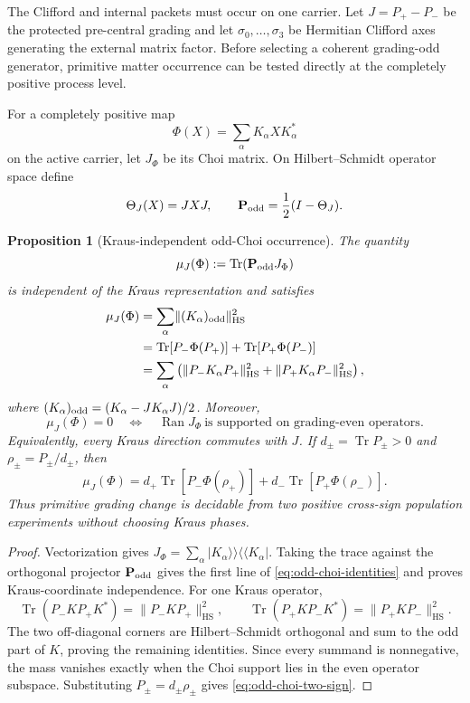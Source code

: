 \documentclass[11pt]{article}
\numberwithin{equation}{section}
\newtheorem{proposition}[theorem]{Proposition}
\theoremstyle{definition}
\theoremstyle{remark}
\newcommand{\Tr}{\operatorname{Tr}}
\newcommand{\Ran}{\operatorname{Ran}}
\newcommand{\HS}{\mathrm{HS}}
\newcommand{\norm}[1]{\lVert#1\rVert}
\begin{document}
The Clifford and internal packets must occur on one carrier.  Let
$J=P_+-P_-$ be the protected pre-central grading and let
$\sigma_0,\ldots,\sigma_3$ be Hermitian Clifford axes generating the external
matrix factor.  Before selecting a coherent grading-odd generator, primitive
matter occurrence can be tested directly at the completely positive process
level.

For a completely positive map
\[
\Phi(X)=\sum_\alpha K_\alpha X K_\alpha^*
\]
on the active carrier, let $J_\Phi$ be its Choi matrix.  On Hilbert--Schmidt
operator space define
\[
\Theta_J(X)=JXJ,
\qquad
\mathbf P_{\rm odd}=\frac12(I-\Theta_J).
\]

\begin{proposition}[Kraus-independent odd-Choi occurrence]
\label{thm:odd-choi-occurrence}
The quantity
\begin{equation}
\mu_J(\Phi):=\Tr(\mathbf P_{\rm odd}J_\Phi)
\label{eq:odd-choi-mass}
\end{equation}
is independent of the Kraus representation and satisfies
\begin{equation}
\begin{aligned}
\mu_J(\Phi)
&=\sum_\alpha\norm{(K_\alpha)_{\rm odd}}_{\HS}^2\\
&=\Tr[P_-\Phi(P_+)]+\Tr[P_+\Phi(P_-)]\\
&=\sum_\alpha\left(
\norm{P_-K_\alpha P_+}_{\HS}^2
+\norm{P_+K_\alpha P_-}_{\HS}^2\right),
\end{aligned}
\label{eq:odd-choi-identities}
\end{equation}
where $(K_\alpha)_{\rm odd}=(K_\alpha-JK_\alpha J)/2$.
Moreover,
\begin{equation}
\mu_J(\Phi)=0
\quad\Longleftrightarrow\quad
\Ran J_\Phi\ \text{is supported on grading-even operators}.
\label{eq:odd-choi-zero}
\end{equation}
Equivalently, every Kraus direction commutes with $J$.  If
$d_\pm=\Tr P_\pm>0$ and $\rho_\pm=P_\pm/d_\pm$, then
\begin{equation}
\mu_J(\Phi)
=d_+\Tr[P_-\Phi(\rho_+)]
+d_-\Tr[P_+\Phi(\rho_-)].
\label{eq:odd-choi-two-sign}
\end{equation}
Thus primitive grading change is decidable from two positive cross-sign
population experiments without choosing Kraus phases.
\end{proposition}

\begin{proof}
Vectorization gives
$J_\Phi=\sum_\alpha|K_\alpha\rangle\!\rangle
\langle\!\langle K_\alpha|$.  Taking the trace against the orthogonal
projector $\mathbf P_{\rm odd}$ gives the first line of
\eqref{eq:odd-choi-identities} and proves Kraus-coordinate independence.
For one Kraus operator,
\[
\Tr(P_-KP_+K^*)=\norm{P_-KP_+}_{\HS}^2,
\qquad
\Tr(P_+KP_-K^*)=\norm{P_+KP_-}_{\HS}^2.
\]
The two off-diagonal corners are Hilbert--Schmidt orthogonal and sum to the
odd part of $K$, proving the remaining identities.  Since every summand is
nonnegative, the mass vanishes exactly when the Choi support lies in the even
operator subspace.  Substituting $P_\pm=d_\pm\rho_\pm$ gives
\eqref{eq:odd-choi-two-sign}.
\end{proof}
\end{document}
